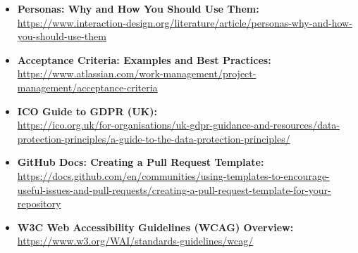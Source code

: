 \documentclass[a4paper,12pt]{article}
\begin{document}
\begin{itemize}
    \item \textbf{Personas: Why and How You Should Use Them:} \\\href{https://www.interaction-design.org/literature/article/personas-why-and-how-you-should-use-them}{https://www.interaction-design.org/literature/article/personas-why-and-how-you-should-use-them}
    \item \textbf{Acceptance Criteria: Examples and Best Practices:} \\\href{https://www.atlassian.com/work-management/project-management/acceptance-criteria}{https://www.atlassian.com/work-management/project-management/acceptance-criteria}
    \item \textbf{ICO Guide to GDPR (UK):} \\\href{https://ico.org.uk/for-organisations/uk-gdpr-guidance-and-resources/data-protection-principles/a-guide-to-the-data-protection-principles/}{https://ico.org.uk/for-organisations/uk-gdpr-guidance-and-resources/data-protection-principles/a-guide-to-the-data-protection-principles/}
    \item \textbf{GitHub Docs: Creating a Pull Request Template:} \\\href{https://docs.github.com/en/communities/using-templates-to-encourage-useful-issues-and-pull-requests/creating-a-pull-request-template-for-your-repository}{https://docs.github.com/en/communities/using-templates-to-encourage-useful-issues-and-pull-requests/creating-a-pull-request-template-for-your-repository}
    \item \textbf{W3C Web Accessibility Guidelines (WCAG) Overview:} \\\href{https://www.w3.org/WAI/standards-guidelines/wcag/}{https://www.w3.org/WAI/standards-guidelines/wcag/}
\end{itemize}
\end{document}

